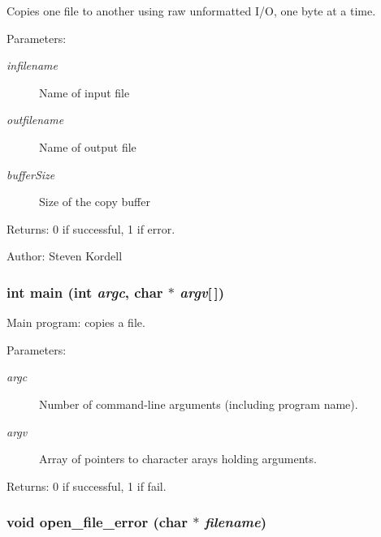 Copies one file to another using raw unformatted I/O, one byte at a time. \begin{Desc}
\item[Parameters:]
\begin{description}
\item[{\em infilename}]Name of input file \item[{\em outfilename}]Name of output file \item[{\em buffer\-Size}]Size of the copy buffer \end{description}
\end{Desc}
\begin{Desc}
\item[Returns:]0 if successful, 1 if error. \end{Desc}
\begin{Desc}
\item[Author:]Steven Kordell \end{Desc}
\subsubsection{\setlength{\rightskip}{0pt plus 5cm}int main (int {\em argc}, char $\ast$ {\em argv}[$\,$])}\label{cptest_8c_28052c36c3b61c6c0eaa18f5d226118f}


Main program: copies a file. \begin{Desc}
\item[Parameters:]
\begin{description}
\item[{\em argc}]Number of command-line arguments (including program name). \item[{\em argv}]Array of pointers to character arays holding arguments. \end{description}
\end{Desc}
\begin{Desc}
\item[Returns:]0 if successful, 1 if fail. \end{Desc}
\subsubsection{\setlength{\rightskip}{0pt plus 5cm}void open\_\-file\_\-error (char $\ast$ {\em filename})}\label{cptest_8c_24e89f857b6c4f8cfadd8bf854978b28}


